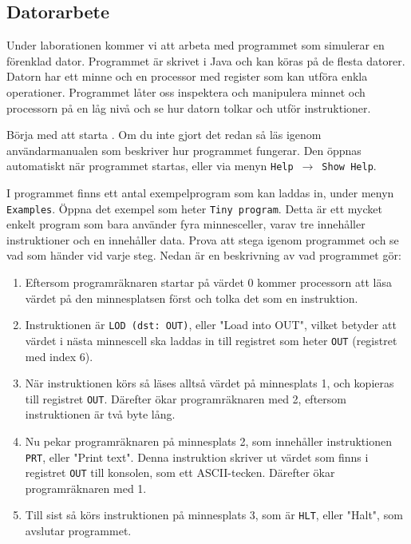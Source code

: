 \clearpage
\subsection*{Datorarbete}
Under laborationen kommer vi att arbeta med programmet \progname{} som simulerar en förenklad dator. Programmet är skrivet i Java och kan köras på de flesta datorer. Datorn har ett minne och en processor med register som kan utföra enkla operationer. Programmet låter oss inspektera och manipulera minnet och processorn på en låg nivå och se hur datorn tolkar och utför instruktioner.

\begin{Datorarbete}
    \item Börja med att starta \progname{}. Om du inte gjort det redan så läs igenom användarmanualen som beskriver hur programmet fungerar. Den öppnas automatiskt när programmet startas, eller via menyn \texttt{Help}~$\rightarrow$~\texttt{Show Help}.

    \item I programmet finns ett antal exempelprogram som kan laddas in, under menyn \texttt{Examples}. Öppna det exempel som heter \texttt{Tiny program}. Detta är ett mycket enkelt program som bara använder fyra minnesceller, varav tre innehåller instruktioner och en innehåller data. Prova att stega igenom programmet och se vad som händer vid varje steg. Nedan är en beskrivning av vad programmet gör:
    \begin{enumerate}
        \item Eftersom programräknaren startar på värdet 0 kommer processorn att läsa värdet på den minnesplatsen först och tolka det som en instruktion.
        \item Instruktionen är \texttt{LOD (dst: OUT)}, eller "Load into OUT", vilket betyder att värdet i nästa minnescell ska laddas in till registret som heter \texttt{OUT} (registret med index 6).
        \item När instruktionen körs så läses alltså värdet på minnesplats 1, och kopieras till registret \texttt{OUT}. Därefter ökar programräknaren med 2, eftersom instruktionen är två byte lång.
        \item Nu pekar programräknaren på minnesplats 2, som innehåller instruktionen \texttt{PRT}, eller "Print text". Denna instruktion skriver ut värdet som finns i registret \texttt{OUT} till konsolen, som ett ASCII-tecken. Därefter ökar programräknaren med 1.
        \item Till sist så körs instruktionen på minnesplats 3, som är \texttt{HLT}, eller "Halt", som avslutar programmet.
    \end{enumerate}


\end{Datorarbete}
